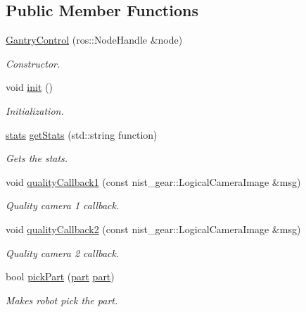\subsection*{Public Member Functions}
\begin{DoxyCompactItemize}
\item 
\hyperlink{classGantryControl_a9b8ad2f8dda14130976eb5d9634acbae}{Gantry\+Control} (ros\+::\+Node\+Handle \&node)
\begin{DoxyCompactList}\small\item\em Constructor. \end{DoxyCompactList}\item 
void \hyperlink{classGantryControl_a71f13d325c732d931ed5ed175c5b3e7a}{init} ()
\begin{DoxyCompactList}\small\item\em Initialization. \end{DoxyCompactList}\item 
\hyperlink{utils_8h_abd807f196b951c0cdd24d50164d54763}{stats} \hyperlink{classGantryControl_a2ac175070ddb578c03bb5a33cf2d49a4}{get\+Stats} (std\+::string function)
\begin{DoxyCompactList}\small\item\em Gets the stats. \end{DoxyCompactList}\item 
void \hyperlink{classGantryControl_a6557b18bde7b776e6a05fe85d9e858d9}{quality\+Callback1} (const nist\+\_\+gear\+::\+Logical\+Camera\+Image \&msg)
\begin{DoxyCompactList}\small\item\em Quality camera 1 callback. \end{DoxyCompactList}\item 
void \hyperlink{classGantryControl_a355b299969bfa74073062ba1c6c1ec04}{quality\+Callback2} (const nist\+\_\+gear\+::\+Logical\+Camera\+Image \&msg)
\begin{DoxyCompactList}\small\item\em Quality camera 2 callback. \end{DoxyCompactList}\item 
bool \hyperlink{classGantryControl_af9280bbee71d1ceca8aef3d616d48254}{pick\+Part} (\hyperlink{utils_8h_a67ee3a5b9091664130eca8efc8b97ab9}{part} \hyperlink{utils_8h_a67ee3a5b9091664130eca8efc8b97ab9}{part})
\begin{DoxyCompactList}\small\item\em Makes robot pick the part. \end{DoxyCompactList}\item 

\end{DoxyCompactItemize}
